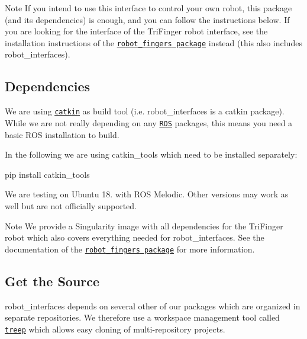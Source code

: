 \begin{DoxyNote}{Note}
If you intend to use this interface to control your own robot, this package (and its dependencies) is enough, and you can follow the instructions below. If you are looking for the interface of the Tri\+Finger robot interface, see the installation instructions of the \href{https://open-dynamic-robot-initiative.github.io/code_documentation/robot_fingers/docs/doxygen/html/index.html}{\tt {\ttfamily robot\+\_\+fingers} package} instead (this also includes {\ttfamily robot\+\_\+interfaces}).
\end{DoxyNote}
\subsection*{Dependencies }

We are using \href{http://wiki.ros.org/catkin}{\tt catkin} as build tool (i.\+e. {\ttfamily robot\+\_\+interfaces} is a catkin package). While we are not really depending on any \href{http://www.ros.org}{\tt R\+OS} packages, this means you need a basic R\+OS installation to build.

In the following we are using catkin\+\_\+tools which need to be installed separately\+: \begin{DoxyVerb}pip install catkin_tools
\end{DoxyVerb}


We are testing on Ubuntu 18. with R\+OS Melodic. Other versions may work as well but are not officially supported.

\begin{DoxyNote}{Note}
We provide a Singularity image with all dependencies for the Tri\+Finger robot which also covers everything needed for {\ttfamily robot\+\_\+interfaces}. See the documentation of the \href{https://open-dynamic-robot-initiative.github.io/code_documentation/robot_fingers/docs/doxygen/html/index.html}{\tt {\ttfamily robot\+\_\+fingers} package} for more information.
\end{DoxyNote}
\subsection*{Get the Source }

{\ttfamily robot\+\_\+interfaces} depends on several other of our packages which are organized in separate repositories. We therefore use a workspace management tool called \href{https://pypi.org/project/treep/}{\tt treep} which allows easy cloning of multi-\/repository projects.

